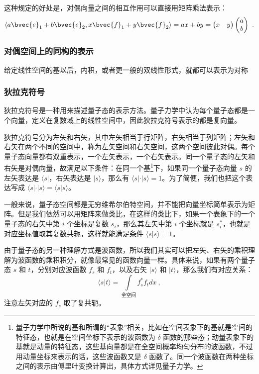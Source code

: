 这种规定的好处是，对偶向量之间的相互作用可以直接用矩阵乘法表示：
\begin{equation}
\langle a\bvec{e}_1+b\bvec{e}_2 , x\bvec{f}_1+y\bvec{f}_2 \rangle = ax+by = 
\begin{pmatrix}
x&y
\end{pmatrix}
\begin{pmatrix}
a\\
b
\end{pmatrix}~. 
\end{equation}




\subsubsection{对偶空间上的同构的表示}


给定线性空间的基以后，内积，或者更一般的双线性形式，就都可以表示为对称





\subsubsection{狄拉克符号}

狄拉克符号是一种用来描述量子态的表示方法。量子力学中认为每个量子态都是一个向量，定义在复数域上的线性空间中，因此狄拉克符号表示的都是复向量。

狄拉克符号分为左矢和右矢，其中左矢相当于行矩阵，右矢相当于列矩阵；左矢和右矢在两个不同的空间中，称为左矢空间和右矢空间，这两个空间彼此对偶。每个量子态向量都有双重表示，一个左矢表示，一个右矢表示。同一个量子态的左矢和右矢是对偶向量，故满足以下条件：在同一个基\footnote{量子力学中所说的基和所谓的“表象”相关，比如在空间表象下的基就是空间的特征态，也就是在空间坐标下表示的波函数为 $\delta$ 函数的那些态；动量表象下的基就是动量的特征态，这些基向量都是在全空间概率均匀分布的波函数，不过用动量坐标来表示的话，这些波函数又是 $\delta$ 函数了。同一个波函数在两种坐标之间的表示由傅里叶变换计算出，具体方式详见量子力学。}下，如果同一个量子态向量 $s$ 的左矢表达是 $\langle s|$，右矢表达是 $|s\rangle$，那么有 $\langle s|\cdot|s\rangle=1$。为了简便，我们也把这个表达写成 $\langle s|\cdot|s\rangle=\langle s|s\rangle$。

一般来说，量子态空间都是无穷维希尔伯特空间，并不能把向量坐标简单表示为矩阵。但是我们依然可以用矩阵来做类比，在这样的类比下，如果一个表象下的一个量子态的右矢中第 $i$ 个坐标是复数 $s_i$，那么其左矢中第 $i$ 个坐标就是 $s_i^*$，也就是对应坐标值取其复数共轭，这样就能满足条件 $\langle s|s\rangle=1$。

由于量子态的另一种理解方式是波函数，所以我们其实可以把左矢、右矢的乘积理解为波函数的乘积积分，就像最常见的函数向量一样。具体来说，如果有两个量子态 $s$ 和 $t$，分别对应波函数 $f_s$ 和 $f_t$，以及右矢 $|s\rangle$ 和 $|t\rangle$，那么我们有对应关系：
\begin{equation}\langle s|t\rangle=\int\limits_{\text{全空间}}f_s^*f_tdx~,\end{equation}
注意左矢对应的 $f_s$ 取了复共轭。









